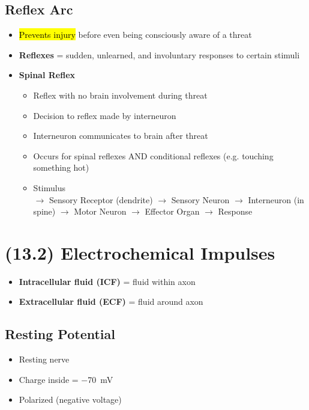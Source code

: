 \documentclass[a4paper,12pt]{article}
\begin{document}
\subsection{Reflex Arc}
\begin{itemize}
    \item{\hl{Prevents injury} before even being consciously aware of a threat}
    \item{\textbf{Reflexes} = sudden, unlearned, and involuntary responses to certain stimuli}
    \item{
            \textbf{Spinal Reflex}
            \begin{itemize}
                \item{Reflex with no brain involvement during threat}
                \item{Decision to reflex made by interneuron}
                \item{Interneuron communicates to brain after threat}
                \item{Occurs for spinal reflexes AND conditional reflexes (e.g. touching something hot)}
                \item{Stimulus \\ $\longrightarrow$ Sensory Receptor (dendrite) $\longrightarrow$ Sensory Neuron $\longrightarrow$ Interneuron (in spine) $\longrightarrow$ Motor Neuron $\longrightarrow$ Effector Organ $\longrightarrow$ Response}
            \end{itemize}
        }
\end{itemize}

\section{(13.2) Electrochemical Impulses}
\begin{itemize}
    \item{\textbf{Intracellular fluid (ICF)} = fluid within axon}
    \item{\textbf{Extracellular fluid (ECF)} = fluid around axon}
\end{itemize}

\subsection{Resting Potential}
\begin{itemize}
    \item{Resting nerve}
    \item{Charge inside = \SI{-70}{\mV}}
    \item{Polarized (negative voltage)}
\end{itemize}
\end{document}
